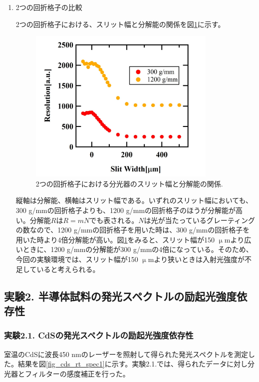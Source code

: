 \documentclass[11pt,a4j]{jsarticle}
\begin{document}
\begin{enumerate}
       \newpage
 \item 2つの回折格子の比較

       2つの回折格子における、スリット幅と分解能の関係を図\ref{fig_resolution1}に示す。

       \begin{figure}[ht]
        \centering
        \includegraphics[clip,width=9cm]{start1_Resolution.jpg}
        \caption{2つの回折格子における分光器のスリット幅と分解能の関係.}
        \label{fig_resolution1}
       \end{figure}

       縦軸は分解能、横軸はスリット幅である。いずれのスリット幅においても、300 g/mmの回折格子よりも、1200 g/mmの回折格子のほうが分解能が高い。分解能$R$は$R=mN$でも表される。$N$は光が当たっているグレーティングの数なので、1200 g/mmの回折格子を用いた時は、300 g/mmの回折格子を用いた時より4倍分解能が高い。図\ref{fig_resolution1}をみると、スリット幅が150 $\upmu$mより広いときに、1200 g/mmの分解能が300 g/mmの4倍になっている。そのため、今回の実験環境では、スリット幅が150 $\upmu$mより狭いときは入射光強度が不足していると考えられる。%

\end{enumerate}%

\newpage

\subsection{実験2. 半導体試料の発光スペクトルの励起光強度依存性}
\subsubsection{実験2.1. CdSの発光スペクトルの励起光強度依存性}

室温のCdSに波長450 nmのレーザーを照射して得られた発光スペクトルを測定した。結果を図\ref{fig_cds_rt_spec1}に示す。実験2.1.では、得られたデータに対し分光器とフィルターの感度補正を行った。
\end{document}
